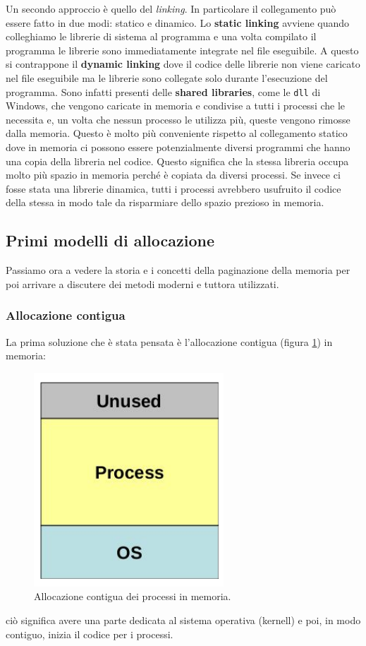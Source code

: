 Un secondo approccio è quello del \textit{linking}. In particolare il collegamento può essere fatto in due modi: statico e dinamico. Lo \textbf{static linking} avviene quando colleghiamo le librerie di sistema al programma e una volta compilato il programma le librerie sono immediatamente integrate nel file eseguibile. A questo si contrappone il \textbf{dynamic linking} dove il codice delle librerie non viene caricato nel file eseguibile ma le librerie sono collegate solo durante l'esecuzione del programma. Sono infatti presenti delle \textbf{shared libraries}, come le \texttt{dll} di Windows, che vengono caricate in memoria e condivise a tutti i processi che le necessita e, un volta che nessun processo le utilizza più, queste vengono rimosse dalla memoria. Questo è molto più conveniente rispetto al collegamento statico dove in memoria ci possono essere potenzialmente diversi programmi che hanno una copia della libreria nel codice. Questo significa che la stessa libreria occupa molto più spazio in memoria perché è copiata da diversi processi. Se invece ci fosse stata una librerie dinamica, tutti i processi avrebbero usufruito il codice della stessa in modo tale da risparmiare dello spazio prezioso in memoria.

% 
\subsection{Primi modelli di allocazione}
Passiamo ora a vedere la storia e i concetti della paginazione della memoria per poi arrivare a discutere dei metodi moderni e tuttora utilizzati.

% 
\subsubsection{Allocazione contigua}
La prima soluzione che è stata pensata è l'allocazione contigua (figura \ref{fig:memory_contiguos_allocation}) in memoria: 
\begin{figure}[h]
    \centering
    \includegraphics[width = .15\textwidth]{../res/imgs/main memory/contiguos_allocation.png}
    \caption{Allocazione contigua dei processi in memoria.}
    \label{fig:memory_contiguos_allocation}
\end{figure}
ciò significa avere una parte dedicata al sistema operativa (kernell) e poi, in modo contiguo, inizia il codice per i processi.

